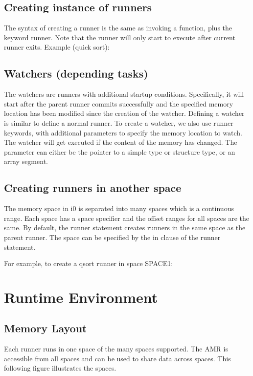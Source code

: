 \documentclass[a4paper]{article}
\begin{document}
\subsection{Creating instance of runners}

The syntax of creating a runner is the same as invoking a function, plus the keyword runner. Note that the runner will only start to execute after current runner exits.
Example (quick sort):



\subsection{Watchers (depending tasks)}

The watchers are runners with additional startup conditions. Specifically, it will start after the parent runner commits successfully and the specified memory location has been modified since the creation of the watcher.
Defining a watcher is similar to define a normal runner.
To create a watcher, we also use runner keywords, with additional parameters to specify the memory location to watch. The watcher will get executed if the content of the memory has changed. The parameter can either be the pointer to a simple type or structure type, or an array segment.



\subsection{Creating runners in another space}

The memory space in i0 is separated into many spaces which is a continuous range. Each space has a space specifier and the offset ranges for all spaces are the same. By default, the runner statement creates runners in the same space as the parent runner. The space can be specified by the in clause of the runner statement.

For example, to create a qsort runner in space SPACE1:



\section{Runtime Environment}

\subsection{Memory Layout}
Each runner runs in one space of the many spaces supported. The AMR is accessible from all spaces and can be used to share data across spaces. This following figure illustrates the spaces.
\end{document}
